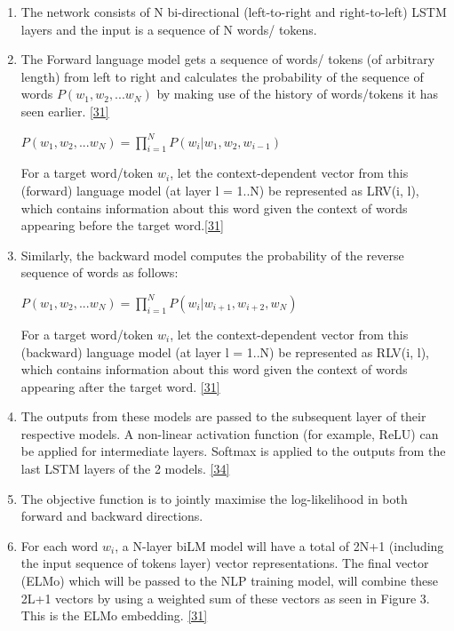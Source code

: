 \begin{enumerate}
    \item The network consists of N bi-directional (left-to-right and right-to-left) LSTM layers and the input is  a sequence of N words/ tokens. 
    
    \item The Forward language model gets a sequence of words/ tokens (of arbitrary length) from left to right and calculates the probability of the sequence of words  $P(w_1, w_2, ... w_N)$ by making use of the history of words/tokens it has seen earlier. \hyperlink{31}{[31]}
        \begin{center}
            $P(w_1, w_2, ... w_N) = \prod_{i = 1}^{N} P (w_i | w_{1}, w_{2}, w_{i-1})$ 
        \end{center}
        
        For a target word/token $w_i$, let the context-dependent vector from this (forward) language model (at layer l = 1..N) be represented as LRV(i, l), which contains information about this word given the context of words appearing before the target word.\hyperlink{31}{[31]}
        
     \item Similarly, the backward model computes the probability of the reverse sequence of words as follows:
        
        \begin{center}
            $P(w_1, w_2, ... w_N) = \prod_{i = 1}^{N} P (w_i | w_{i+1}, w_{i+2}, w_N)$
        \end{center}
        
        For a target word/token $w_i$, let the context-dependent vector from this (backward) language model (at layer l = 1..N) be represented as RLV(i, l), which contains information about this word given the context of words appearing after the target word. \hyperlink{31}{[31]}
        
        \item The outputs from these models are passed to the subsequent layer of their respective models. A non-linear activation function (for example, ReLU) can be applied for intermediate layers. Softmax is applied to the outputs from the last LSTM layers of the 2 models. \hyperlink{34}{[34]}
    
        \item The objective function is to jointly maximise the log-likelihood in both forward and backward directions.
        
        \item For each word $w_i$, a N-layer biLM model will have a total of 2N+1 (including the input sequence of tokens layer) vector representations. The final vector (ELMo) which will be passed to the NLP training model, will combine these 2L+1 vectors by using a weighted sum of these vectors as seen in Figure 3. This is the ELMo embedding. \hyperlink{31}{[31]}
    
\end{enumerate}